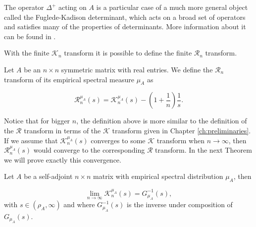 The operator $\Delta^+$ acting on $A$ is a particular case of a much more general object called the Fuglede-Kadison determinant, which acts on a broad set of operators and satisfies many of the properties of determinants. More information about it can be found in \cite{article:fuglede_kadisen_determinant}.

With the finite $\mathcal K_n$ transform it is possible to define the finite $\mathcal R_n$ transform. 

\begin{definition}
    Let $A$ be an $n\times n$ symmetric matrix with real entries. We define the $\mathcal R_n$ transform of its empirical spectral measure $\mu_A$ as 

    \begin{equation*}
        \mathcal R_n^{\mu_A} (s) = \mathcal K_n^{\mu_A}(s) - \left( 1 + \frac1n \right) \frac1s.
    \end{equation*}
\end{definition}

Notice that for bigger $n$, the definition above is more similar to the definition of the $\mathcal R$ transform in terms of the $\mathcal K$ transform given in Chapter \ref{ch:preliminaries}. If we assume that $\mathcal K_n^{\mu_A}(s)$ converges to some $\mathcal K$ transform when $n\to\infty$, then $\mathcal R_n^{\mu_A}(s)$ would converge to the corresponding $\mathcal R$ transform. In the next Theorem we will prove exactly this convergence.

\begin{theorem} Let $A$ be a self-adjoint $n \times n$ matrix with empirical spectral distribution $\mu_A$, then

    \begin{equation*}
        \lim_{n\to\infty} \mathcal K_n^{\mu_A} (s) = G_{\mu_A}^{-1}(s),
    \end{equation*}
\noindent with $s \in (\rho_A, \infty)$ and where $G_{\mu_A}^{-1}(s)$ is the inverse under composition of $G_{\mu_A}(s)$.
\end{theorem}

